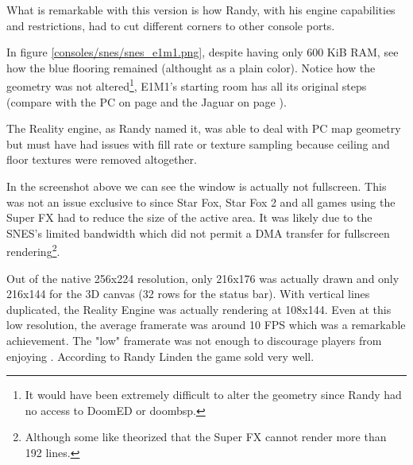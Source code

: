 What is remarkable with this version is how Randy, with his engine capabilities and restrictions, had to cut different corners to other console ports.\\
\par
{}
\par
\vspace{-10pt}
In figure \ref{consoles/snes/snes_e1m1.png}, despite having only 600 KiB RAM, see how the blue flooring remained (althought as a plain color). Notice how the geometry was not altered\footnote{It would have been extremely difficult to alter the geometry since Randy had no access to DoomED or doombsp.}, E1M1's starting room has all its original steps (compare with the PC on page \pageref{mashed_potatoes1.png} and the Jaguar on page \pageref{doom_jaguar3.png}).\\
\par The Reality engine, as Randy named it, was able to deal with PC map geometry but must have had issues with fill rate or texture sampling because ceiling and floor textures were removed altogether.













\par
\vspace{-10pt}
In the screenshot above we can see the window is actually not fullscreen. This was not an issue exclusive to \doom{} since Star Fox, Star Fox 2 and all games using the Super FX had to reduce the size of the active area. It was likely due to the SNES's limited bandwidth which did not permit a DMA transfer for fullscreen rendering\footnote{Although some like  theorized that the Super FX cannot render more than 192 lines.}.\\
\par
Out of the native 256x224 resolution, only 216x176 was actually drawn and only 216x144 for the 3D canvas (32 rows for the status bar). With vertical lines duplicated, the Reality Engine was actually rendering at 108x144. Even at this low resolution, the average framerate was around 10 FPS which was a remarkable achievement. The "low" framerate was not enough to discourage players from enjoying \doom. According to Randy Linden the game sold very well.







